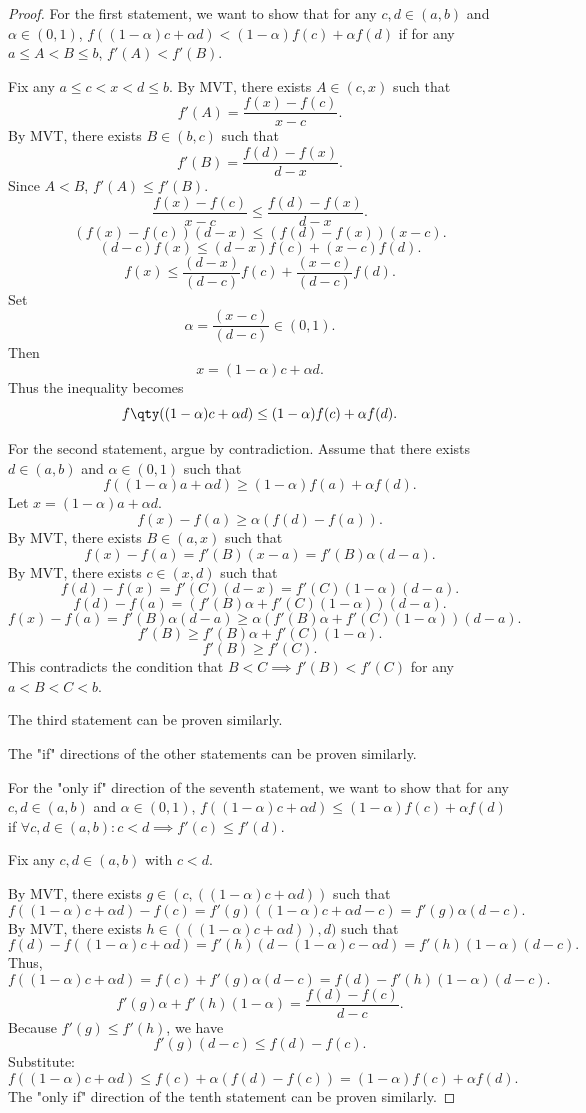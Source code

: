 \begin{proof}
    For the first statement, we want to show that for any $c,d\in (a,b)$ and $\alpha\in(0,1)$, $f((1-\alpha)c+\alpha d)<(1-\alpha)f(c)+\alpha f(d)$ if for any $a\leq A<B\leq b$, $f'(A)<f'(B)$.

    Fix any $a\leq c<x<d\leq b$. By MVT, there exists $A\in (c,x)$ such that
    \[f'(A)=\frac{f(x)-f(c)}{x-c}.\]
    By MVT, there exists $B\in (b,c)$ such that
    \[f'(B)=\frac{f(d)-f(x)}{d-x}.\]
    Since $A<B$, $f'(A)\leq f'(B)$.
    \[\frac{f(x)-f(c)}{x-c}\leq\frac{f(d)-f(x)}{d-x}.\]
    \[(f(x)-f(c))(d-x)\leq(f(d)-f(x))(x-c).\]
    \[(d-c)f(x)\leq(d-x)f(c)+(x-c)f(d).\]
    \[f(x)\leq\frac{(d-x)}{(d-c)}f(c)+\frac{(x-c)}{(d-c)}f(d).\]
    Set
    \[\alpha=\frac{(x-c)}{(d-c)}\in(0,1).\]
    Then
    \[x=(1-\alpha)c+\alpha d.\]
    Thus the inequality becomes
    \[f\qty((1-\alpha)c+\alpha d)\leq(1-\alpha)f(c)+\alpha f(d).\]
    
    For the second statement, argue by contradiction. Assume that there exists $d\in(a,b)$ and $\alpha\in(0,1)$ such that
    \[f((1-\alpha)a+\alpha d)\geq (1-\alpha)f(a)+\alpha f(d).\]
    Let $x=(1-\alpha)a+\alpha d$.
    \[f(x)-f(a)\geq\alpha(f(d)-f(a)).\]
    By MVT, there exists $B\in (a,x)$ such that
    \[f(x)-f(a)=f'(B)(x-a)=f'(B)\alpha (d-a).\]
    By MVT, there exists $c\in (x,d)$ such that
    \[f(d)-f(x)=f'(C)(d-x)=f'(C)(1-\alpha)(d-a).\]
    \[f(d)-f(a)=(f'(B)\alpha+f'(C)(1-\alpha))(d-a).\]
    \[f(x)-f(a)=f'(B)\alpha (d-a)\geq\alpha(f'(B)\alpha+f'(C)(1-\alpha))(d-a).\]
    \[f'(B)\geq f'(B)\alpha+f'(C)(1-\alpha).\]
    \[f'(B)\geq f'(C).\]
    This contradicts the condition that $B<C\implies f'(B)<f'(C)$ for any $a<B<C<b$.
    
    The third statement can be proven similarly.
    
    The "if" directions of the other statements can be proven similarly.
    
    For the "only if" direction of the seventh statement, we want to show that for any $c,d\in (a,b)$ and $\alpha\in(0,1)$, $f((1-\alpha)c+\alpha d)\leq (1-\alpha)f(c)+\alpha f(d)$ if $\forall c,d\in (a,b)\colon c<d\implies f'(c)\leq f'(d)$.
    
    Fix any $c,d\in(a,b)$ with $c<d$.
    
    By MVT, there exists $g\in(c,((1-\alpha)c+\alpha d))$ such that
    \[f((1-\alpha)c+\alpha d)-f(c)=f'(g)((1-\alpha)c+\alpha d-c)=f'(g)\alpha(d-c).\]
    By MVT, there exists $h\in(((1-\alpha)c+\alpha d)),d)$ such that
    \[f(d)-f((1-\alpha)c+\alpha d)=f'(h)(d-(1-\alpha)c-\alpha d)=f'(h)(1-\alpha)(d-c).\]
    Thus,
    \[f((1-\alpha)c+\alpha d)=f(c)+f'(g)\alpha(d-c)=f(d)-f'(h)(1-\alpha)(d-c).\]
    \[f'(g)\alpha+f'(h)(1-\alpha)=\frac{f(d)-f(c)}{d-c}.\]
    Because $f'(g)\leq f'(h)$, we have
    \[f'(g)(d-c)\leq f(d)-f(c).\]
    Substitute:
    \[f((1-\alpha)c+\alpha d)\leq f(c)+\alpha(f(d)-f(c))=(1-\alpha)f(c)+\alpha f(d).\]
    The "only if" direction of the tenth statement can be proven similarly.
\end{proof}
